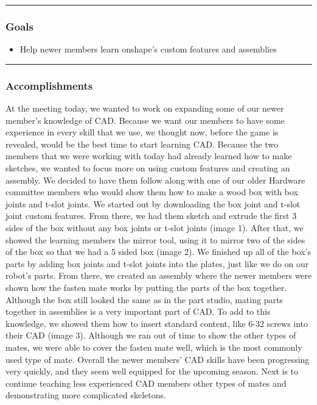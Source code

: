 \noindent\hfil\rule{\textwidth}{.4pt}\hfil
\subsubsection*{Goals}
\begin{itemize}
    \item Help newer members learn onshape’s custom features and assemblies
  

\end{itemize} 

\noindent\hfil\rule{\textwidth}{.4pt}\hfil

\subsubsection*{Accomplishments}
At the meeting today, we wanted to work on expanding some of our newer member’s knowledge of CAD. Because we want our members to have some experience in every skill that we use, we thought now, before the game is revealed, would be the best time to start learning CAD. Because the two members that we were working with today had already learned how to make sketches, we wanted to focus more on using custom features and creating an assembly. We decided to have them follow along with one of our older Hardware committee members who would show them how to make a wood box with box joints and t-slot joints. We started out by downloading the box joint and t-slot joint custom features. From there, we had them sketch and extrude the first 3 sides of the box without any box joints or t-slot joints (image 1). After that, we showed the learning members the mirror tool, using it to mirror two of the sides of the box so that we had a 5 sided box (image 2). We finished up all of the box’s parts by adding box joints and t-slot joints into the plates, just like we do on our robot’s parts. 
From there, we created an assembly where the newer members were shown how the fasten mate works by putting the parts of the box together. Although the box still looked the same as in the part studio, mating parts together in assemblies is a very important part of CAD. To add to this knowledge, we showed them how to insert standard content, like 6-32 screws into their CAD (image 3). Although we ran out of time to show the other types of mates, we were able to cover the fasten mate well, which is the most commonly used type of mate. Overall the newer members’ CAD skills have been progressing very quickly, and they seem well equipped for the upcoming season. Next is to continue teaching less experienced CAD members other types of mates
and demonstrating more complicated skeletons. 

